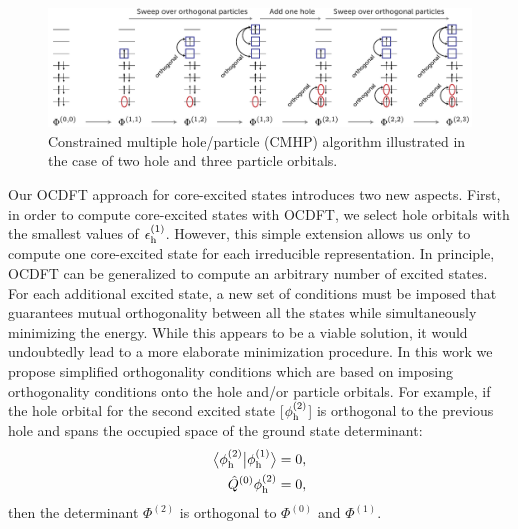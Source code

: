 \documentclass[8.5pt,twoside,twocolumn]{article}
\newcommand{\braket}[3][0]
{\ifthenelse{\equal{#1}{0}}{\left\langle #2 \middle| #3 \right\rangle}
{\ifthenelse{\equal{#1}{1}}{\big\langle #2 \big| #3 \big\rangle}
{\ifthenelse{\equal{#1}{2}}{\Big\langle #2 \Big| #3 \Big\rangle}
{\ifthenelse{\equal{#1}{3}}{\bigg\langle #2 \bigg| #3 \bigg\rangle}
{\ifthenelse{\equal{#1}{4}}{\Bigg\langle #2 \Bigg| #3 \Bigg\rangle}
{Error}}}}}
}
\begin{document}
\begin{figure}
\centering
\includegraphics[width=18cm]{Figure2NEW.pdf}
\caption{Constrained multiple hole/particle (CMHP) algorithm illustrated in the case of two hole and three particle orbitals.}
\label{fig:CMHP}
\end{figure}
Our OCDFT approach for core-excited states introduces two new aspects.
First, in order to compute core-excited states with OCDFT, we select hole orbitals with the smallest values of $\epsilon^{(1)}_{\rm h}$.
However, this simple extension allows us only to compute one core-excited state for each irreducible representation.
In principle, OCDFT can be generalized to compute an arbitrary number of excited states.  For each additional excited state, a new set of conditions must be imposed that guarantees mutual orthogonality  between all the states while simultaneously minimizing the energy.
While this appears to be a viable solution, it would undoubtedly lead to a more elaborate minimization procedure.
In this work we propose simplified orthogonality conditions which are based on imposing orthogonality conditions onto the hole and/or particle orbitals.
For example, if the hole orbital for the second excited state [$\phi_{\rm h}^{(2)}$] is orthogonal to the previous hole and spans the occupied space of the ground state determinant:
\begin{align}
\braket[1]{\phi_{\rm h}^{(2)}}{\phi_{\rm h}^{(1)}} = 0,\\
\hat{Q}^{(0)}\phi_{\rm h}^{(2)} = 0,
\end{align}
then the determinant $\Phi^{(2)}$ is orthogonal to $\Phi^{(0)}$ and $\Phi^{(1)}$.
\end{document}
